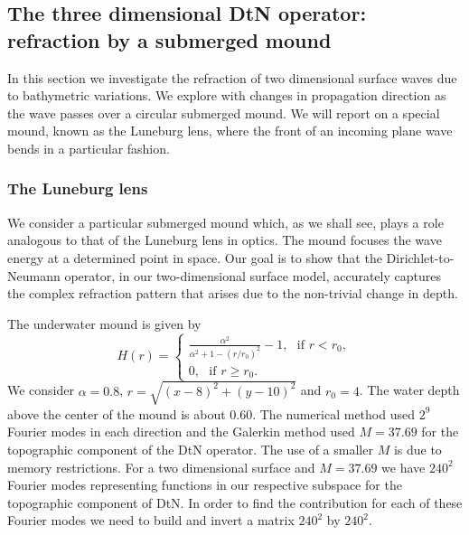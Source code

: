 \subsection{The three dimensional  DtN operator: refraction by a submerged mound}

In this section we investigate the refraction of two dimensional surface waves due to bathymetric variations. 
We explore with  changes in  propagation direction as the wave  passes over a circular submerged mound. 
We will report on a special mound, known as the Luneburg lens,  where the front of an incoming plane wave 
bends in a particular fashion.

\subsubsection{The Luneburg lens}

We consider a particular submerged mound which, as we shall see, plays a role analogous  to that of the Luneburg lens in optics. 
The mound focuses the wave energy at a determined point in space. 
Our goal is to show that the Dirichlet-to-Neumann operator, in our two-dimensional surface model,  accurately captures 
the complex refraction pattern that arises due to the non-trivial change in depth.

The underwater mound is given by 
\begin{equation}\label{S5:Eq01}
H(r) = 
\begin{cases}
\frac{\alpha^2}{\alpha^2 + 1 - ({r}/{r_0})^2} - 1, \ \ \ \text{if $r < r_0,$}\\
0, \ \ \ \text{if $r\geq r_0$.}
\end{cases}
\end{equation}
We consider $\alpha = 0.8$, $r = \sqrt{(x-8)^2+(y-10)^2}$ and $r_0 = 4$. The water depth above the center of the mound is about 
$0.60$.
The numerical method used $2^{9}$ Fourier modes in each direction
and the Galerkin method used $M=37.69$ for the topographic component of the DtN operator. The use of a smaller $M$ is 
due to memory restrictions. For a two dimensional surface and $M=37.69$ we have $240^2$ Fourier modes representing
functions in our respective subspace for the topographic component of DtN. In order to find the contribution for 
each of these Fourier modes we need to build and invert a matrix $240^2$ by $240^2$.


